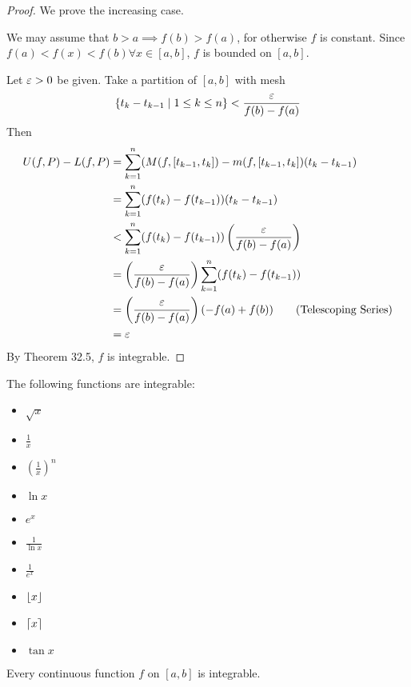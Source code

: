 \documentclass{article}
\begin{document}
\begin{proof}
  We prove the increasing case.

  We may assume that $b > a \implies f(b) > f(a)$, for otherwise $f$ is constant. Since $f(a) < f(x) < f(b) \forall x \in [a, b]$, $f$ is bounded on $[a, b]$.

  Let $\varepsilon > 0$ be given. Take a partition of $[a, b]$ with mesh \[
    \{t_k - t_{k-1} \mid 1 \leq k \leq n\} < \frac{\varepsilon}{f(b) - f(a)}
  \]
  Then
  \begin{align*}
    U(f, P) - L(f, P) &= \sum_{k=1}^n (M(f, [t_{k-1}, t_k]) - m(f, [t_{k-1}, t_k])(t_k - t_{k-1})\\
      &= \sum_{k=1}^n (f(t_k) - f(t_{k-1}))(t_k - t_{k-1})\\
      &< \sum_{k=1}^n (f(t_k) - f(t_{k-1}))\left(\frac{\varepsilon}{f(b) - f(a)}\right)\\
      &= \left(\frac{\varepsilon}{f(b) - f(a)}\right)\sum_{k=1}^n (f(t_k) - f(t_{k-1}))\\
      &= \left(\frac{\varepsilon}{f(b) - f(a)}\right)(-f(a) + f(b)) \tag{Telescoping Series}\\
      &= \varepsilon
    \end{align*}
    By Theorem 32.5, $f$ is integrable.
  \end{proof}
  \begin{example}
    The following functions are integrable:
    \begin{itemize}
      \item $\sqrt{x}$
      \item $\frac{1}{x}$
      \item $\left(\frac{1}{x}\right)^n$
      \item $\ln x$
      \item $e^x$
      \item $\frac{1}{\ln x}$
      \item $\frac{1}{e^x}$
      \item $\lfloor x\rfloor$
      \item $\lceil x\rceil$
      \item $\tan x$
    \end{itemize}
  \end{example}
  \begin{cthm}[Theorem 33.2]
    Every continuous function $f$ on $[a, b]$ is integrable.
  \end{cthm}
\end{document}

